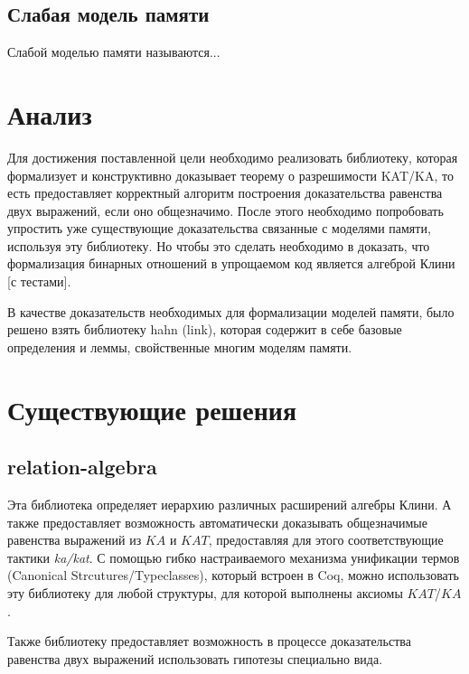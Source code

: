 \documentclass[times
              ]{itmo-student-thesis}
\begin{document}
    \subsection{Слабая модель памяти}
      Слабой моделью памяти называются...


  \section{Анализ}

     Для достижения поставленной цели необходимо реализовать библиотеку, которая формализует и конструктивно доказывает теорему о разрешимости KAT/KA, то есть предоставляет корректный алгоритм построения доказательства равенства двух выражений, если оно общезначимо. После этого необходимо попробовать упростить уже существующие доказательства связанные с моделями памяти, используя эту библиотеку. Но чтобы это сделать необходимо в доказать, что формализация бинарных отношений в упрощаемом код является алгеброй Клини [с тестами].

     В качестве доказательств необходимых для формализации моделей памяти, было решено взять библиотеку hahn (link), которая содержит в себе базовые определения и леммы, свойственные многим моделям памяти.

  \section{Существующие решения}

     \subsection{relation-algebra}
       Эта библиотека определяет иерархию различных расширений алгебры Клини. А также предоставляет возможность автоматически доказывать общезначимые равенства выражений из $KA$ и $KAT$, предоставляя для этого соответствующие тактики \textit{ka/kat}.
       С помощью гибко настраиваемого механизма унификации термов (Canonical Strcutures/Typeclasses), который встроен в Coq, можно использовать эту библиотеку для любой структуры, для которой выполнены аксиомы $KAT$/$KA$.

       Также библиотеку предоставляет возможность в процессе доказательства равенства двух выражений использовать гипотезы специально вида.
\end{document}
